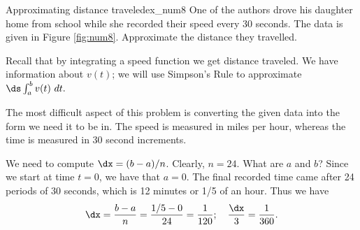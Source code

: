 \begin{example}{Approximating distance traveled}{ex_num8}
{
One of the authors drove his daughter home from school while she recorded their speed every $ 30 $ seconds. The data is given in Figure \ref{fig:num8}. Approximate the distance they travelled.
}
\end{example}

\begin{solution}{
Recall that by integrating a speed function we get distance traveled. We have information about $v(t)$; we will use Simpson's Rule to approximate $\ds \int_a^b v(t)\ dt.$ 

The most difficult aspect of this problem is converting the given data into the form we need it to be in. The speed is measured in miles per hour, whereas the time is measured in 30 second increments. 

We need to compute $\dx = (b-a)/n$. Clearly, $n=24$. What are $a$ and $b$? Since we start at time $t=0$, we have that $a=0$. The final recorded time came after 24 periods of 30 seconds, which is 12 minutes or 1/5 of an hour. Thus we have
$$\dx = \frac{b-a}{n} = \frac{1/5-0}{24} = \frac1{120}; \quad \frac{\dx}{3} = \frac{1}{360}.$$

}
\end{solution}

